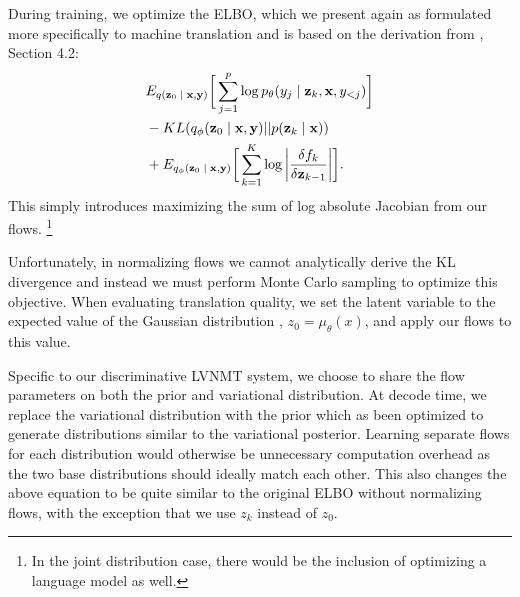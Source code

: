 During training, we optimize the \ac{ELBO}, which we present again as formulated more specifically to machine translation and is based on the derivation from \citet{rezende2015VIwithNF}, Section 4.2:
\begin{align}
\begin{split}\label{eq:2}
&
E_{q(\textbf{z}_{0}\; | \;{\textbf{x}, \textbf{y}})} \bigg[ \sum_{j=1}^{p} \log p_{\theta}(y_{j} \; | \;{\textbf{z}_{k}}, \textbf{x}, y_{<j}) \bigg] \\
& - KL(q_{\phi}(\textbf{z}_{0} \; | \;{\textbf{x}, \textbf{y}}) || p(\textbf{z}_{k} \; | \;{\textbf{x}})) \\
&   +  E_{q_{\phi}(\textbf{z}_{0} \; | \;{\textbf{x}, \textbf{y}})} \bigg[\sum_{k=1}^{K} \log \bigg|\frac{\delta f_{k}}{\delta \textbf{z}_{k-1}} \bigg| \bigg].
\end{split}
\end{align}
This simply introduces maximizing the sum of  log absolute Jacobian from our flows. \footnote{In the joint distribution case, there would be the inclusion of optimizing a language model as well.}

Unfortunately, in normalizing flows we cannot analytically derive the KL divergence and instead we must perform Monte Carlo sampling to optimize this objective. When evaluating translation quality, we set the latent variable to the expected value of the Gaussian distribution , $z_{0} = \mu_{\theta}(x)$, and apply our flows to this value.

Specific to our discriminative \ac{LVNMT} system, we choose to share the flow parameters on both the prior and variational distribution. At decode time, we replace the variational distribution with the prior which as been optimized to generate distributions similar to the variational posterior. Learning separate flows for each distribution would otherwise be unnecessary computation overhead as the two base distributions should ideally match each other. This also changes the above equation to be quite similar to the original \ac{ELBO} without normalizing flows, with the exception that we use $z_{k}$ instead of $z_{0}$.









